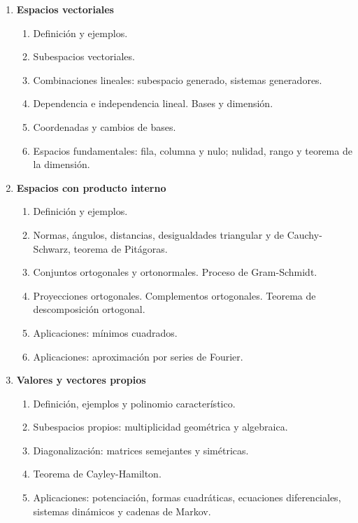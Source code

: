 \begin{enumerate}
\item \textbf{Espacios vectoriales}
\begin{enumerate}[$a)$]
\item Definición y ejemplos.
\item Subespacios vectoriales.
\item Combinaciones lineales: subespacio generado, sistemas generadores.
\item Dependencia e independencia lineal. Bases y dimensión.
\item Coordenadas y cambios de bases.
\item Espacios fundamentales: fila, columna y nulo; nulidad, rango y teorema de la dimensión.
\end{enumerate}

\item \textbf{Espacios con producto interno}
\begin{enumerate}[$a)$]
\item Definición y ejemplos.
\item Normas, ángulos, distancias, desigualdades triangular y de Cauchy-Schwarz, teorema de Pitágoras.
\item Conjuntos ortogonales y ortonormales. Proceso de Gram-Schmidt.
\item Proyecciones ortogonales. Complementos ortogonales. Teorema de descomposición ortogonal.
\item Aplicaciones: mínimos cuadrados.
\item Aplicaciones: aproximación por series de Fourier.
\end{enumerate}

\item \textbf{Valores y vectores propios}
\begin{enumerate}[$a)$]
\item Definición, ejemplos y polinomio característico.
\item Subespacios propios: multiplicidad geométrica y algebraica.
\item Diagonalización: matrices semejantes y simétricas.
\item Teorema de Cayley-Hamilton.
\item Aplicaciones: potenciación, formas cuadráticas, ecuaciones diferenciales, sistemas dinámicos y cadenas de Markov.
\end{enumerate}


\end{enumerate}
